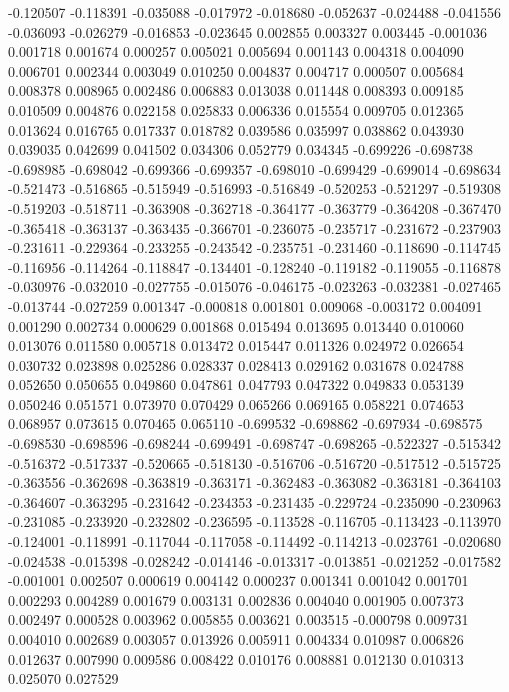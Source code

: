 -0.120507
-0.118391
-0.035088
-0.017972
-0.018680
-0.052637
-0.024488
-0.041556
-0.036093
-0.026279
-0.016853
-0.023645
0.002855
0.003327
0.003445
-0.001036
0.001718
0.001674
0.000257
0.005021
0.005694
0.001143
0.004318
0.004090
0.006701
0.002344
0.003049
0.010250
0.004837
0.004717
0.000507
0.005684
0.008378
0.008965
0.002486
0.006883
0.013038
0.011448
0.008393
0.009185
0.010509
0.004876
0.022158
0.025833
0.006336
0.015554
0.009705
0.012365
0.013624
0.016765
0.017337
0.018782
0.039586
0.035997
0.038862
0.043930
0.039035
0.042699
0.041502
0.034306
0.052779
0.034345
-0.699226
-0.698738
-0.698985
-0.698042
-0.699366
-0.699357
-0.698010
-0.699429
-0.699014
-0.698634
-0.521473
-0.516865
-0.515949
-0.516993
-0.516849
-0.520253
-0.521297
-0.519308
-0.519203
-0.518711
-0.363908
-0.362718
-0.364177
-0.363779
-0.364208
-0.367470
-0.365418
-0.363137
-0.363435
-0.366701
-0.236075
-0.235717
-0.231672
-0.237903
-0.231611
-0.229364
-0.233255
-0.243542
-0.235751
-0.231460
-0.118690
-0.114745
-0.116956
-0.114264
-0.118847
-0.134401
-0.128240
-0.119182
-0.119055
-0.116878
-0.030976
-0.032010
-0.027755
-0.015076
-0.046175
-0.023263
-0.032381
-0.027465
-0.013744
-0.027259
0.001347
-0.000818
0.001801
0.009068
-0.003172
0.004091
0.001290
0.002734
0.000629
0.001868
0.015494
0.013695
0.013440
0.010060
0.013076
0.011580
0.005718
0.013472
0.015447
0.011326
0.024972
0.026654
0.030732
0.023898
0.025286
0.028337
0.028413
0.029162
0.031678
0.024788
0.052650
0.050655
0.049860
0.047861
0.047793
0.047322
0.049833
0.053139
0.050246
0.051571
0.073970
0.070429
0.065266
0.069165
0.058221
0.074653
0.068957
0.073615
0.070465
0.065110
-0.699532
-0.698862
-0.697934
-0.698575
-0.698530
-0.698596
-0.698244
-0.699491
-0.698747
-0.698265
-0.522327
-0.515342
-0.516372
-0.517337
-0.520665
-0.518130
-0.516706
-0.516720
-0.517512
-0.515725
-0.363556
-0.362698
-0.363819
-0.363171
-0.362483
-0.363082
-0.363181
-0.364103
-0.364607
-0.363295
-0.231642
-0.234353
-0.231435
-0.229724
-0.235090
-0.230963
-0.231085
-0.233920
-0.232802
-0.236595
-0.113528
-0.116705
-0.113423
-0.113970
-0.124001
-0.118991
-0.117044
-0.117058
-0.114492
-0.114213
-0.023761
-0.020680
-0.024538
-0.015398
-0.028242
-0.014146
-0.013317
-0.013851
-0.021252
-0.017582
-0.001001
0.002507
0.000619
0.004142
0.000237
0.001341
0.001042
0.001701
0.002293
0.004289
0.001679
0.003131
0.002836
0.004040
0.001905
0.007373
0.002497
0.000528
0.003962
0.005855
0.003621
0.003515
-0.000798
0.009731
0.004010
0.002689
0.003057
0.013926
0.005911
0.004334
0.010987
0.006826
0.012637
0.007990
0.009586
0.008422
0.010176
0.008881
0.012130
0.010313
0.025070
0.027529

